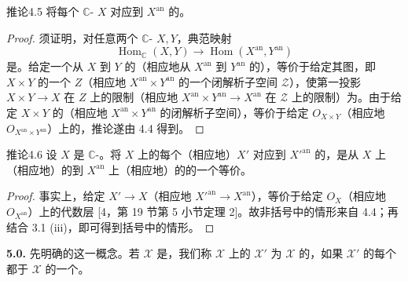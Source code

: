\begin{SGAresult}{推论}{4.5}
将每个 $\mathbb C$- $X$ 对应到 $X^{\mathrm{an}}$ 的。
\end{SGAresult}
\begin{proof}
须证明，对任意两个 $\mathbb C$- $X,Y$，典范映射
\[
\operatorname{Hom}_{\mathbb C}(X,Y)\longrightarrow
\operatorname{Hom}(X^{\mathrm{an}},Y^{\mathrm{an}})
\]
是。给定一个从 $X$ 到 $Y$ 的（相应地从 $X^{\mathrm{an}}$ 到 $Y^{\mathrm{an}}$ 的），等价于给定其图，即 $X\times Y$ 的一个 $Z$（相应地 $X^{\mathrm{an}}\times Y^{\mathrm{an}}$ 的一个闭解析子空间 $\mathcal Z$），使第一投影 $X\times Y\to X$ 在 $Z$ 上的限制（相应地 $X^{\mathrm{an}}\times Y^{\mathrm{an}}\to X^{\mathrm{an}}$ 在 $\mathcal Z$ 上的限制）为。由于给定 $X\times Y$ 的（相应地 $X^{\mathrm{an}}\times Y^{\mathrm{an}}$ 的闭解析子空间），等价于给定 $O_{X\times Y}$（相应地 $O_{X^{\mathrm{an}}\times Y^{\mathrm{an}}}$）上的，推论遂由 4.4 得到。
\end{proof}

\begin{SGAresult}{推论}{4.6}
设 $X$ 是 $\mathbb C$-。将 $X$ 上的每个（相应地）$X'$ 对应到 $X'^{\mathrm{an}}$ 的，是从 $X$ 上（相应地）的到 $X^{\mathrm{an}}$ 上（相应地）的的一个等价。
\end{SGAresult}
\begin{proof}
事实上，给定 $X'\to X$（相应地 $X'^{\mathrm{an}}\to X^{\mathrm{an}}$），等价于给定 $O_X$（相应地 $O_{X^{\mathrm{an}}}$）上的代数层 [4，第 19 节第 5 小节定理 2]。故非括号中的情形来自 4.4；再结合 3.1 (iii)，即可得到括号中的情形。
\end{proof}

\textbf{5.0.} 先明确的这一概念。若 $\mathcal X$ 是，我们称 $\mathcal X$ 上的 $\mathcal X'$ 为 $\mathcal X$ 的，如果 $\mathcal X'$ 的每个都于 $\mathcal X$ 的一个。

